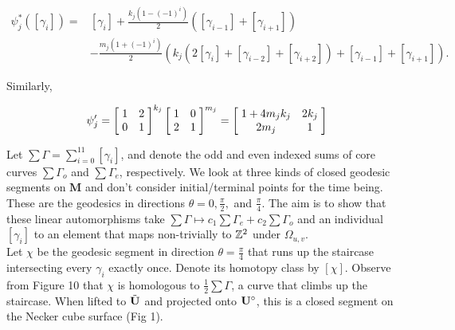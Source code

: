 \documentclass[]{article}
\def\bM{\mathbf{M}}
\begin{document}
\begin{align*}
\psi_j^*([\gamma_i])=&[\gamma_i]+\frac{k_j(1-(-1)^i)}{2}([\gamma_{i-1}]+[\gamma_{i+1}])\\&-\frac{m_j(1+(-1)^i)}{2}(k_j(2[\gamma_i]+[\gamma_{i-2}]+[\gamma_{i+2}]) +[\gamma_{i-1}]+[\gamma_{i+1}]).
\end{align*}

\noindent Similarly,

\begin{align*}
\psi_j'=\left[ \hspace{1mm} \begin{matrix}
				1 &   2\\
				0 & 1
			\end{matrix}\hspace{1mm}\right]^{k_j}\left[ \hspace{1mm} \begin{matrix}
							1 &   0\\
							2 & 1
						\end{matrix}\hspace{1mm}\right]^{m_j}=\left[ \hspace{1mm} \begin{matrix}
										1+4m_jk_j &   2k_j\\
										2m_j & 1
									\end{matrix}\hspace{1mm}\right]
\end{align*}


\noindent Let $\sum\Gamma=\sum_{i=0}^{11}[\gamma_i]$, and denote the odd and even indexed sums of core curves $\sum\Gamma_o$ and $\sum\Gamma_e$, respectively. We look at three kinds of closed geodesic segments on $\bM$ and don't consider initial/terminal points for the time being. These are the geodesics in directions $\theta=0,\frac{\pi}{2},$ and $\frac{\pi}{4}$. The aim is to show that these linear automorphisms take $\sum\Gamma\mapsto c_1\sum\Gamma_e+c_2\sum\Gamma_o$ and an individual $[\gamma_i]$ to an element that maps non-trivially to $\mathbb{Z}^2$ under $\Omega_{u,v}$. \\



\noindent Let $\chi$ be the geodesic segment in direction $\theta=\frac{\pi}{4}$ that runs up the staircase intersecting every $\gamma_i$ exactly once. Denote its homotopy class by $[\chi]$. Observe from Figure 10 that $\chi$ is homologous to $\frac{1}{2}\sum\Gamma$, a curve that climbs up the staircase. When lifted to $\tilde{\mathbf{U}}$ and projected onto $\mathbf{U}^\circ$, this is a closed segment on the Necker cube surface (Fig 1).
\end{document}
